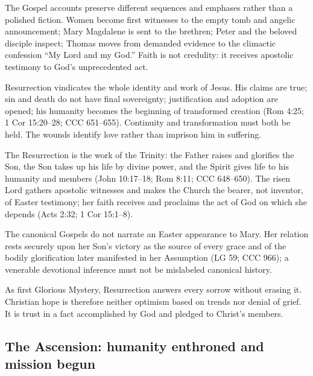 The Gospel accounts preserve different sequences and emphases rather than a polished fiction. Women become first witnesses to the empty tomb and angelic announcement; Mary Magdalene is sent to the brethren; Peter and the beloved disciple inspect; Thomas moves from demanded evidence to the climactic confession ``My Lord and my God.'' Faith is not credulity: it receives apostolic testimony to God's unprecedented act.

Resurrection vindicates the whole identity and work of Jesus. His claims are true; sin and death do not have final sovereignty; justification and adoption are opened; his humanity becomes the beginning of transformed creation (Rom 4:25; 1 Cor 15:20--28; CCC 651--655). Continuity and transformation must both be held. The wounds identify love rather than imprison him in suffering.

The Resurrection is the work of the Trinity: the Father raises and glorifies the Son, the Son takes up his life by divine power, and the Spirit gives life to his humanity and members (John 10:17--18; Rom 8:11; CCC 648--650). The risen Lord gathers apostolic witnesses and makes the Church the bearer, not inventor, of Easter testimony; her faith receives and proclaims the act of God on which she depends (Acts 2:32; 1 Cor 15:1--8).

The canonical Gospels do not narrate an Easter appearance to Mary. Her relation rests securely upon her Son's victory as the source of every grace and of the bodily glorification later manifested in her Assumption (LG 59; CCC 966); a venerable devotional inference must not be mislabeled canonical history.

As first Glorious Mystery, Resurrection answers every sorrow without erasing it. Christian hope is therefore neither optimism based on trends nor denial of grief. It is trust in a fact accomplished by God and pledged to Christ's members.

\subsection{The Ascension: humanity enthroned and mission begun}


